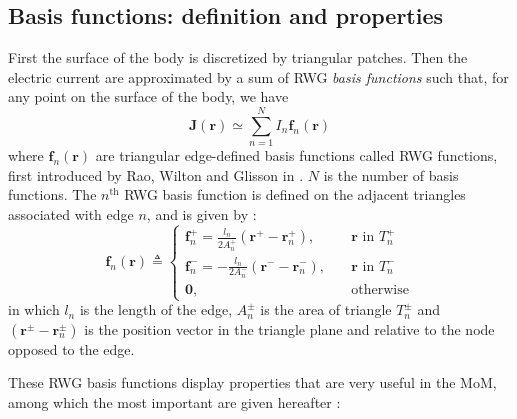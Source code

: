 \documentclass[a4paper,10pt]{book}
\newcommand{\vect}[1]{\mathbf{#1}}
\renewcommand{\arg}[1]{\ensuremath{\!\left(#1\right)}}
\begin{document}
\subsection{Basis functions: definition and properties}
\label{subsubsec:Basis functions: definition and properties}
%
\par
First the surface of the body is discretized by triangular patches. Then the electric current are approximated by a sum of RWG \emph{basis functions} such that, for any point on the surface of the body, we have
\begin{equation}\label{eqn:current_decomposition}
\vect{J}\arg{\vect{r}} \simeq \sum_{n = 1}^{N} I_n \vect{f}_n \arg{\vect{r}}
\end{equation}
where $\vect{f}_n \arg{\vect{r}}$ are triangular edge-defined basis functions called RWG functions, first introduced by Rao, Wilton and Glisson in \cite{Rao_82}. $N$ is the number of basis functions. The $n^\text{th}$ RWG basis function is defined on the adjacent triangles associated with edge $n$, and is given by \cite{Michalski_90}:
\begin{equation} \label{eqn:RWG definition}
\vect{f}_n \arg{\vect{r}} \triangleq
\begin{cases}
\vect{f}_n^+ = \frac{l_n}{2 A_n^+} \left( \vect{r}^+ - \vect{r}_n^+\right), & \quad \text{$\vect{r}$ in $T_n^+$} \\
\vect{f}_n^- = -\frac{l_n}{2 A_n^-} \left( \vect{r}^- - \vect{r}_n^-\right), & \quad \text{$\vect{r}$ in $T_n^-$} \\
\vect{0}, & \quad \text{otherwise}
\end{cases}
\end{equation}
in which $l_n$ is the length of the edge, $A_n^\pm$ is the area of triangle $T_n^\pm$ and $\left( \vect{r}^\pm - \vect{r}_n^\pm\right)$ is the position vector in the triangle plane and relative to the node opposed to the edge.
%
\par
These RWG basis functions display properties that are very useful in the MoM, among which the most important are given hereafter \cite{Rao_82}:
\end{document}
